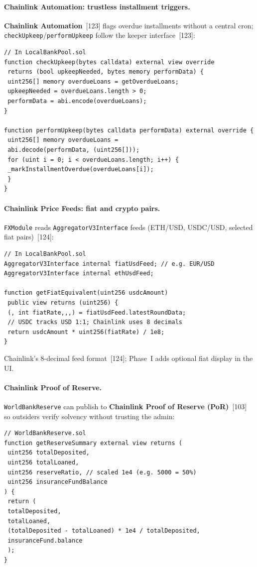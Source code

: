 \documentclass[12pt, a4paper]{report}
\begin{document}
\paragraph{Chainlink Automation: trustless installment triggers.}
\textbf{Chainlink Automation}~[123] flags overdue installments without a central cron; \texttt{checkUpkeep}/\texttt{performUpkeep} follow the keeper interface~[123]:

\begin{verbatim}
// In LocalBankPool.sol
function checkUpkeep(bytes calldata) external view override
 returns (bool upkeepNeeded, bytes memory performData) {
 uint256[] memory overdueLoans = getOverdueLoans;
 upkeepNeeded = overdueLoans.length > 0;
 performData = abi.encode(overdueLoans);
}

function performUpkeep(bytes calldata performData) external override {
 uint256[] memory overdueLoans =
 abi.decode(performData, (uint256[]));
 for (uint i = 0; i < overdueLoans.length; i++) {
 _markInstallmentOverdue(overdueLoans[i]);
 }
}
\end{verbatim}

\paragraph{Chainlink Price Feeds: fiat and crypto pairs.}
\texttt{FXModule} reads \texttt{AggregatorV3Interface} feeds (ETH/USD, USDC/USD, selected fiat pairs)~[124]:

\begin{verbatim}
// In LocalBankPool.sol
AggregatorV3Interface internal fiatUsdFeed; // e.g. EUR/USD
AggregatorV3Interface internal ethUsdFeed;

function getFiatEquivalent(uint256 usdcAmount)
 public view returns (uint256) {
 (, int fiatRate,,,) = fiatUsdFeed.latestRoundData;
 // USDC tracks USD 1:1; Chainlink uses 8 decimals
 return usdcAmount * uint256(fiatRate) / 1e8;
}
\end{verbatim}

Chainlink's 8-decimal feed format~[124]; Phase~I adds optional fiat display in the UI.

\paragraph{Chainlink Proof of Reserve.}
\texttt{WorldBankReserve} can publish to \textbf{Chainlink Proof of Reserve (PoR)}~[103] so outsiders verify solvency without trusting the admin:

\begin{verbatim}
// WorldBankReserve.sol
function getReserveSummary external view returns (
 uint256 totalDeposited,
 uint256 totalLoaned,
 uint256 reserveRatio, // scaled 1e4 (e.g. 5000 = 50%)
 uint256 insuranceFundBalance
) {
 return (
 totalDeposited,
 totalLoaned,
 (totalDeposited - totalLoaned) * 1e4 / totalDeposited,
 insuranceFund.balance
 );
}
\end{verbatim}
\end{document}
